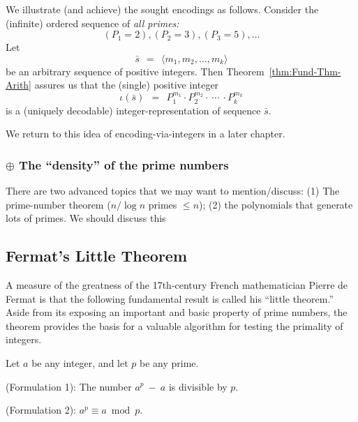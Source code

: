 We illustrate (and achieve) the sought encodings as follows.  Consider
the (infinite) ordered sequence of {\em all primes:}
\[ (P_1 = 2), (P_2 = 3), (P_3 = 5), \ldots  \]
Let
\begin{equation}
\label{eq:sequence-vec-s}
\bar{s} \ \ = \ \ \langle m_1, m_2, \ldots, m_k \rangle
\end{equation}
be an arbitrary sequence of positive integers.  Then
Theorem~\ref{thm:Fund-Thm-Arith} assures us that the (single) positive
integer
\[ 
\iota(\bar{s}) \ \ = \ \ P_1^{m_1} \cdot P_2^{m_2} \cdot \ \cdots \
\cdot P_k^{m_k}
\]
is a (uniquely decodable) integer-representation of sequence $\bar{s}$.

We return to this idea of encoding-via-integers in a later chapter.

\subsubsection{$\oplus$ The ``density'' of the prime numbers}
\label{sec:prime-density}

{\Arny There are two advanced topics that we may want to
  mention/discuss: (1) The prime-number theorem ($n/ \log n$ primes
  $\leq n$); (2) the polynomials that generate lots of primes.  We
  should discuss this}
  

\subsection{Fermat's Little Theorem}
\label{sec:fermat}

A measure of the greatness of the 17th-century French mathematician
Pierre de Fermat \index{Fermat, Pierre de} is that the following
fundamental result is called his ``little theorem.''  Aside from its
exposing an important and basic property of prime numbers, the theorem
provides the basis for a valuable algorithm for testing the primality
of integers.


\begin{theorem}
\label{thm:Fermat's-Little-Thm}

Let $a$ be any integer, and let $p$ be any prime.

{\rm (Formulation 1):}
The number $a^p \ − \ a$ is divisible by $p$.

\medskip

{\rm (Formulation 2):}
$a^{p} \equiv a \bmod p$.
\end{theorem}

